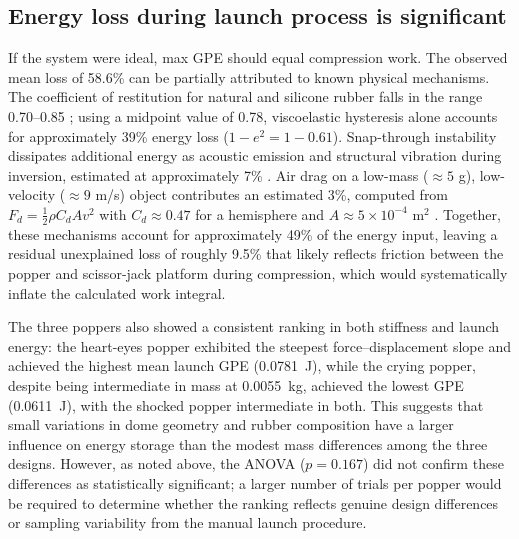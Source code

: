 \documentclass[reprint,amsmath,amssymb,aps,twoside]{revtex4-2} %
\begin{document}
\subsection{Energy loss during launch process is significant}
If the system were ideal, max GPE should equal compression work. The observed mean loss of 58.6\% can be partially attributed to known physical mechanisms. The coefficient of restitution for natural and silicone rubber falls in the range 0.70--0.85 \cite{persson:2006:rubber,simeonov:2016:coefficient,sendrowicz2022stored}; using a midpoint value of 0.78, viscoelastic hysteresis alone accounts for approximately 39\% energy loss ($1 - e^2 = 1 - 0.61$). Snap-through instability dissipates additional energy as acoustic emission and structural vibration during inversion, estimated at approximately 7\% \cite{forterre:2005:venus,timoshenko:1961:theory,gomez:2017:critical,gent:1999:surface,arrieta:2011:piezoelectric}. Air drag on a low-mass ($\approx 5$ g), low-velocity ($\approx 9$ m/s) object contributes an estimated 3\%, computed from $F_d = \frac{1}{2}\rho C_d A v^2$ with $C_d \approx 0.47$ for a hemisphere and $A \approx 5 \times 10^{-4}$ m$^2$ \cite{tipler,openstax}. Together, these mechanisms account for approximately 49\% of the energy input, leaving a residual unexplained loss of roughly 9.5\% that likely reflects friction between the popper and scissor-jack platform during compression, which would systematically inflate the calculated work integral.

The three poppers also showed a consistent ranking in both stiffness and launch energy: the heart-eyes popper exhibited the steepest force--displacement slope and achieved the highest mean launch GPE (\qty{0.0781}{\joule}), while the crying popper, despite being intermediate in mass at \qty{0.0055}{\kilo\gram}, achieved the lowest GPE (\qty{0.0611}{\joule}), with the shocked popper intermediate in both. This suggests that small variations in dome geometry and rubber composition have a larger influence on energy storage \cite{forterre:2005:venus,timoshenko:1961:theory,gomez:2017:critical,gent:1999:surface} than the modest mass differences among the three designs. However, as noted above, the ANOVA ($p = 0.167$) did not confirm these differences as statistically significant; a larger number of trials per popper would be required to determine whether the ranking reflects genuine design differences or sampling variability from the manual launch procedure.
\end{document}
